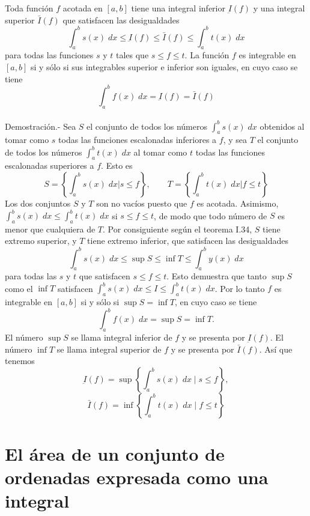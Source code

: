 \begin{multicols}{2}
\begin{teo}
    Toda función $f$ acotada en $[a,b]$ tiene una integral inferior $\underbar{I}(f)$ y una integral superior $\bar{I}(f)$ que satisfacen las desigualdades $$\int_a^b s(x) \; dx \leq \underbar{I}(f) \leq \bar{I}(f) \leq \int_a^b t(x) \; dx$$ 
    para todas las funciones $s$ y $t$ tales que $s\leq f\leq t$. La función $f$ es integrable en $[a,b]$ si y sólo si sus integrables superior e inferior son iguales, en cuyo caso se tiene $$\int_a^b f(x) \; dx = \underbar{I}(f)=\bar{I}(f)$$\\
    Demostración.-\; Sea $S$ el conjunto de todos los números $\int_a^b s(x)\; dx$ obtenidos al tomar como $s$ todas las funciones escalonadas inferiores a $f$, y sea $T$ el conjunto de todos los números $\int_a^b t(x)\; dx$ al tomar como $t$ todas las funciones escalonadas superiores a $f$. Esto es $$ S=\left\{ \int_a^b s(x)\; dx | s\leq f\right\}, \qquad T=\left\{ \int_a^b t(x)\; dx | f\leq t\right\}$$ 
    Los dos conjuntos $S$ y $T$ son no vacíos puesto que $f$ es acotada. Asimismo, $\int_a^b s(x)\; dx \leq \int_a^b t(x)\; dx$ si $s\leq f \leq t$, de modo que todo número de $S$ es menor que cualquiera de $T$. Por consiguiente según el teorema I.34, $S$ tiene extremo superior, y $T$ tiene extremo inferior, que satisfacen las desigualdades $$\int_a^b s(x)\; dx \leq \sup S \leq \inf T \leq \int_a^b y(x)\; dx$$
    para todas las $s$ y $t$ que satisfacen $s\leq f\leq t$. Esto demuestra que tanto $\sup S$ como el $\inf T$ satisfacen $\int_a^b s(x)\; dx \leq I\leq \int_a^b t(x)\; dx$. Por lo tanto $f$ es integrable en $[a,b]$ si y sólo si $\sup S = \inf T$, en cuyo caso se tiene $$\int_a^b f(x)\; dx = \sup S = \inf T.$$
    El número $\sup S$ se llama integral inferior de $f$ y se presenta por $\underbar{I}(f)$. El número $\inf T$ se llama integral superior de $f$ y se presenta por $\bar{I}(f)$. Así que tenemos 
    $$\underbar{I}(f)=\sup \left\{\int_a^b s(x) \; dx \; | \; s\leq f\right\},$$ $$ \bar{I}(f)=\inf \left\{\int_a^b t(x) \; dx \; | \; f\leq t\right\}$$
\end{teo}

\section*{El área de un conjunto de ordenadas expresada como una integral}


\end{multicols}

